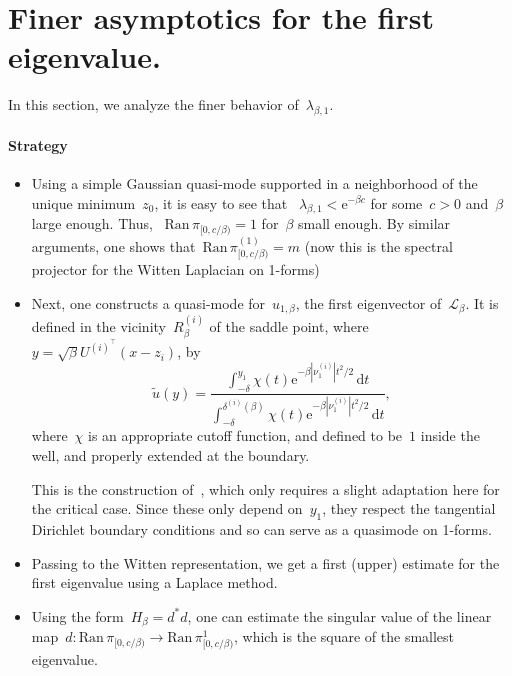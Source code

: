 \documentclass[10pt]{article}
\newcommand{\cL}{\mathcal{L}}
\renewcommand{\d}{\mathrm{d}}
\newcommand{\e}{\mathrm{e}}
\newcommand{\1}{\mathbbm 1}
\newcommand{\deltai}{\delta^{(i)}}
\begin{document}
    \section{Finer asymptotics for the first eigenvalue.}
        In this section, we analyze the finer behavior of~$\lambda_{\beta,1}$. 

        \paragraph{Strategy}
        \begin{itemize}
            \item{Using a simple Gaussian quasi-mode supported in a neighborhood of the unique minimum~$z_0$, it is easy to see that 
           ~$\lambda_{\beta,1} < \e^{-\beta c}$ for some~$c>0$ and~$\beta$ large enough.
            Thus,
           ~$\mathrm{Ran}\,\pi_{[0,c/\beta)}=1$ for~$\beta$ small enough. By similar arguments, one shows that~$\mathrm{Ran}\,\pi^{(1)}_{[0,c/\beta)}= m$ (now this is the spectral projector for the Witten Laplacian on 1-forms)} 
            \item{
                Next, one constructs a quasi-mode for~$u_{1,\beta}$, the first eigenvector of~$\cL_\beta$. It is defined in the vicinity~$R_\beta^(i)$ of the saddle point,
                where~$y = \sqrt{\beta}{U^{(i)^\intercal}}(x-z_i)$, by
               ~$$\widetilde{u}(y) = \frac{\int_{-\delta}^{y_1}\chi(t)\e^{-\beta|\nu_1^{(i)}|t^2/2}\,\d t}{\int_{-\delta}^{\deltai(\beta) }\chi(t)\e^{-\beta|\nu_1^{(i)}|t^2/2}\,\d t},$$
                where~$\chi$ is an appropriate cutoff function, and defined to be~$1$ inside the well, and properly extended at the boundary.

                This is the construction of~\cite{LPN21}, which only requires a slight adaptation here for the critical case.
                Since these only depend on~$y_1$, they respect the tangential Dirichlet boundary conditions and so can serve as a quasimode on 1-forms.
            }
            \item{
                Passing to the Witten representation, we get a first (upper) estimate for the first eigenvalue using a Laplace method.
            }
            \item{Using the form~$H_\beta = d^*d$, one can estimate the singular value of the linear map~$d : \mathrm{Ran}\,\pi_{[0,c/\beta)}\to \mathrm{Ran}\,\pi^{1}_{[0,c/\beta)}$}, which is the square of the smallest eigenvalue. 
        \end{itemize}
\end{document}
